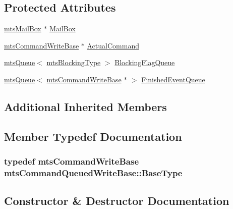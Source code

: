 \subsection*{Protected Attributes}
\begin{DoxyCompactItemize}
\item 
\hyperlink{classmts_mail_box}{mts\+Mail\+Box} $\ast$ \hyperlink{classmts_command_queued_write_base_aff12f0b8e184ae4891388a5c0c647724}{Mail\+Box}
\item 
\hyperlink{classmts_command_write_base}{mts\+Command\+Write\+Base} $\ast$ \hyperlink{classmts_command_queued_write_base_a0b7c5cdfff1c742e84796cf3f80bbd68}{Actual\+Command}
\item 
\hyperlink{classmts_queue}{mts\+Queue}$<$ \hyperlink{mts_forward_declarations_8h_ad7426ccb6c883bc780d0ee197dddcbe7}{mts\+Blocking\+Type} $>$ \hyperlink{classmts_command_queued_write_base_a8aba2d8465fe58370e4058b9b4998621}{Blocking\+Flag\+Queue}
\item 
\hyperlink{classmts_queue}{mts\+Queue}$<$ \hyperlink{classmts_command_write_base}{mts\+Command\+Write\+Base} $\ast$ $>$ \hyperlink{classmts_command_queued_write_base_a67c11afa021916f995d1d537312c9a4c}{Finished\+Event\+Queue}
\end{DoxyCompactItemize}
\subsection*{Additional Inherited Members}


\subsection{Member Typedef Documentation}
\hypertarget{classmts_command_queued_write_base_aff4a3cf3c103da033abb3cbee439d1ce}{}
\subsubsection[{Base\+Type}]{\setlength{\rightskip}{0pt plus 5cm}typedef {\bf mts\+Command\+Write\+Base} {\bf mts\+Command\+Queued\+Write\+Base\+::\+Base\+Type}\hspace{0.3cm}{\ttfamily [protected]}}\label{classmts_command_queued_write_base_aff4a3cf3c103da033abb3cbee439d1ce}


\subsection{Constructor \& Destructor Documentation}
\hypertarget{classmts_command_queued_write_base_a37c683e821be080652509253afdf26f4}{}
